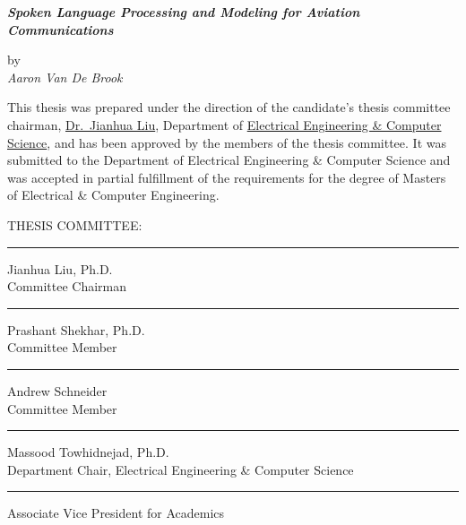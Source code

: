\documentclass[12pt]{article}
\begin{document}
\begin{center}
    \LARGE
    \textbf{
        \textit{
            Spoken Language Processing and Modeling for Aviation Communications\\
        }
    }

    \vspace*{0.2in}

    \normalsize
    by\\
    \textit{Aaron Van De Brook}\\

    \vspace*{0.25in}

\end{center}
This thesis was prepared under the direction of the candidate's thesis
committee chairman, \underline{Dr.~Jianhua Liu}, Department of \underline{Electrical Engineering \&
    Computer Science}, and has been approved by the members of the thesis committee.
It was submitted to the Department of Electrical Engineering \& Computer Science
and was accepted in partial fulfillment of the requirements for the degree of
Masters of Electrical \& Computer Engineering.

\begin{center}
    \begin{minipage}{3in}
        \vspace*{0.25in}
        THESIS COMMITTEE:\\
        \vspace*{0.25in}
        \hrule
        \vspace*{2pt}
        Jianhua Liu, Ph.D.\\
        Committee Chairman\\
        \vspace*{0.75in}
        \hrule
        \vspace*{2pt}
        Prashant Shekhar, Ph.D.\\
        Committee Member\\
        \vspace*{0.75in}
        \hrule
        \vspace*{2pt}
        Andrew Schneider\\
        Committee Member\\
        \vspace*{0.75in}
        \hrule
        \vspace*{2pt}
        Massood Towhidnejad, Ph.D.\\
        Department Chair, Electrical Engineering \& Computer Science\\
        \vspace*{0.75in}
        \hrule
        \vspace*{2pt}
        Associate Vice President for Academics
    \end{minipage}
\end{center}
\newpage
\tableofcontents
\newpage
\doublespacing{}
\end{document}
